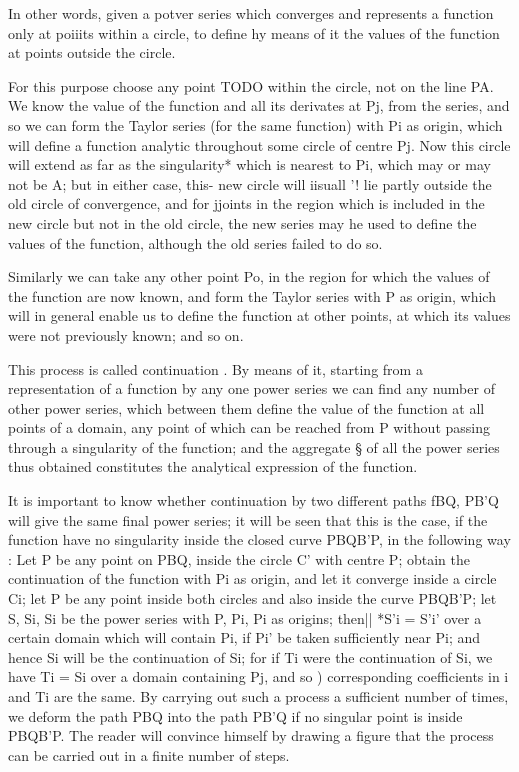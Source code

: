 {{%
%

In other words, given a potver series which converges and represents a
function only at poiiits within a circle, to define hy means of it the
values of the function at points outside the circle.

For this purpose choose any point TODO within the circle, not on the
line PA. We know the value of the function and all its derivates at
Pj, from the series, and so we can form the Taylor series (for the
same function) with Pi as origin, which will define a function
analytic throughout some circle of centre Pj. Now this circle will
extend as far as the singularity* which is nearest to Pi, which may or
may not be A; but in either case, this- new circle will iisuall '!
lie partly outside the old circle of convergence, and for jjoints in
the region which is included in the new circle but not in the old
circle, the new series may he used to define the values of the
function, although the old series failed to do so.

Similarly we can take any other point Po, in the region for which the
values of the function are now known, and form the Taylor series with
P as origin, which will in general enable us to define the function at
other points, at which its values were not previously known; and so
on.

This process is called continuation . By means of it, starting from a
representation of a function by any one power series we can find any
number of other power series, which between them define the value of
the function at all points of a domain, any point of which can be
reached from P without passing through a singularity of the function;
and the aggregate § of all the power series thus obtained constitutes
the analytical expression of the function.

It is important to know whether continuation by two different paths
fBQ, PB'Q will give the same final power series; it will be seen that
this is the case, if the function have no singularity inside the
closed curve PBQB'P, in the following way : Let P be any point on PBQ,
inside the circle C' with centre P; obtain the continuation of the
function with Pi as origin, and let it converge inside a circle Ci;
let P be any point inside both circles and also inside the curve
PBQB'P; let S, Si, Si be the power series with P, Pi, Pi as origins;
then|| *S'i = S'i' over a certain domain which will contain Pi, if Pi'
be taken sufficiently near Pi; and hence Si will be the continuation
of Si; for if Ti were the continuation of Si, we have Ti = Si over a
domain containing Pj, and so ) corresponding coefficients in i
and Ti are the same. By carrying out such a process a sufficient
number of times, we deform the path PBQ into the path PB'Q if no
singular point is inside PBQB'P. The reader will convince himself by
drawing a figure that the process can be carried out in a finite
number of steps.

}}

